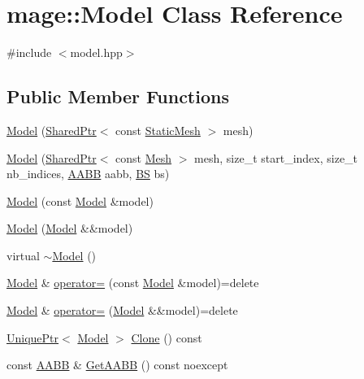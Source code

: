 \hypertarget{classmage_1_1_model}{}\section{mage\+:\+:Model Class Reference}
\label{classmage_1_1_model}


{\ttfamily \#include $<$model.\+hpp$>$}

\subsection*{Public Member Functions}
\begin{DoxyCompactItemize}
\item 
\hyperlink{classmage_1_1_model_a6f67b215aa2db0a593ef7a8ee77fb4d3}{Model} (\hyperlink{namespacemage_a1e01ae66713838a7a67d30e44c67703e}{Shared\+Ptr}$<$ const \hyperlink{classmage_1_1_static_mesh}{Static\+Mesh} $>$ mesh)
\item 
\hyperlink{classmage_1_1_model_a6f8f226a76be925e0fa2e9ed045fded2}{Model} (\hyperlink{namespacemage_a1e01ae66713838a7a67d30e44c67703e}{Shared\+Ptr}$<$ const \hyperlink{classmage_1_1_mesh}{Mesh} $>$ mesh, size\+\_\+t start\+\_\+index, size\+\_\+t nb\+\_\+indices, \hyperlink{structmage_1_1_a_a_b_b}{A\+A\+BB} aabb, \hyperlink{structmage_1_1_b_s}{BS} bs)
\item 
\hyperlink{classmage_1_1_model_ac5f1d340bbfefd30bec3e6343a86059a}{Model} (const \hyperlink{classmage_1_1_model}{Model} \&model)
\item 
\hyperlink{classmage_1_1_model_a71abc57cde3bd6270de88bfa3aa47601}{Model} (\hyperlink{classmage_1_1_model}{Model} \&\&model)
\item 
virtual \hyperlink{classmage_1_1_model_af9f45ed2dcf470f85bbfd144ca9857a7}{$\sim$\+Model} ()
\item 
\hyperlink{classmage_1_1_model}{Model} \& \hyperlink{classmage_1_1_model_a563515c64ec39cfcda9f6ca37576391b}{operator=} (const \hyperlink{classmage_1_1_model}{Model} \&model)=delete
\item 
\hyperlink{classmage_1_1_model}{Model} \& \hyperlink{classmage_1_1_model_a084e30d15822bfefa79128f30a57cc02}{operator=} (\hyperlink{classmage_1_1_model}{Model} \&\&model)=delete
\item 
\hyperlink{namespacemage_a3316d7143a973e37adf1110f2e80ca31}{Unique\+Ptr}$<$ \hyperlink{classmage_1_1_model}{Model} $>$ \hyperlink{classmage_1_1_model_a39d5f0b2b83729a68569072d69113ed7}{Clone} () const
\item 
const \hyperlink{structmage_1_1_a_a_b_b}{A\+A\+BB} \& \hyperlink{classmage_1_1_model_a07af22d1e72ffde3ad33b709a8d5c7f4}{Get\+A\+A\+BB} () const noexcept

\end{DoxyCompactItemize}
